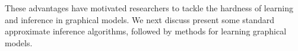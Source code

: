 These advantages have motivated researchers to tackle the hardness of learning and inference in graphical models. We next discuss present some standard approximate inference algorithms, followed by methods for learning graphical models.

